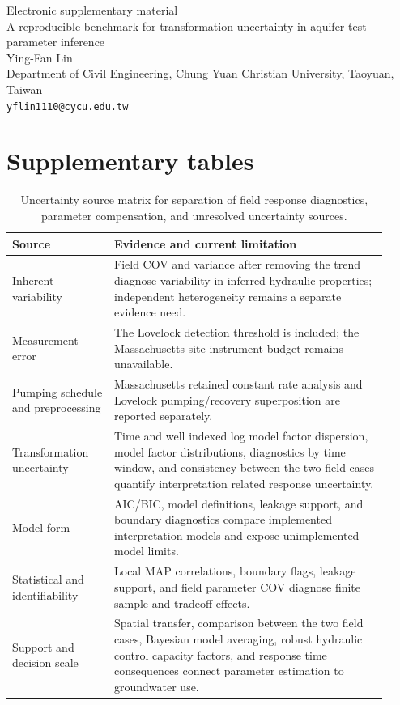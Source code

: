 \documentclass[12pt]{article}
\begin{document}
\begin{center}
{\Large Electronic supplementary material}\\[0.5em]
{\large A reproducible benchmark for transformation uncertainty in aquifer-test parameter inference}\\[0.5em]
Ying-Fan Lin\\
Department of Civil Engineering, Chung Yuan Christian University, Taoyuan, Taiwan\\
\texttt{yflin1110@cycu.edu.tw}
\end{center}

\section*{Supplementary tables}

\begin{table}[!htbp]
\centering
\footnotesize
\setlength{\tabcolsep}{4pt}
\renewcommand{\arraystretch}{0.95}
\caption{Uncertainty source matrix for separation of field response diagnostics, parameter compensation, and unresolved uncertainty sources.}
\label{tab:s_uncertaintysources}
\begin{tabular}{@{}p{0.25\linewidth}p{0.67\linewidth}@{}}
\toprule
Source & Evidence and current limitation \\
\midrule
Inherent variability & Field COV and variance after removing the trend diagnose variability in inferred hydraulic properties; independent heterogeneity remains a separate evidence need. \\
Measurement error & The Lovelock detection threshold is included; the Massachusetts site instrument budget remains unavailable. \\
Pumping schedule and preprocessing & Massachusetts retained constant rate analysis and Lovelock pumping/recovery superposition are reported separately. \\
Transformation uncertainty & Time and well indexed log model factor dispersion, model factor distributions, diagnostics by time window, and consistency between the two field cases quantify interpretation related response uncertainty. \\
Model form & AIC/BIC, model definitions, leakage support, and boundary diagnostics compare implemented interpretation models and expose unimplemented model limits. \\
Statistical and identifiability & Local MAP correlations, boundary flags, leakage support, and field parameter COV diagnose finite sample and tradeoff effects. \\
Support and decision scale & Spatial transfer, comparison between the two field cases, Bayesian model averaging, robust hydraulic control capacity factors, and response time consequences connect parameter estimation to groundwater use. \\
\bottomrule
\end{tabular}
\end{table}
\end{document}
